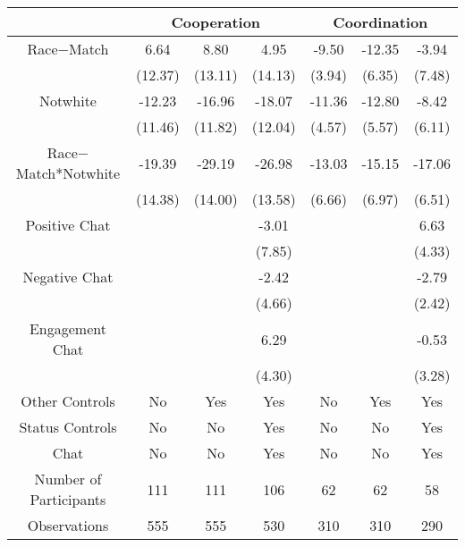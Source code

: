 \begin{table}[htbp]
    \begin{tabular}{c c c c c c c}
    \toprule
          & \multicolumn{3}{c}{Cooperation}   &\multicolumn{3}{c}{Coordination}     \\
\midrule
Race$-$Match      &  6.64                   &   8.80             &  4.95     &  -9.50\sym{**}  &  -12.35\sym{**}   &  -3.94   \\
                  &  (12.37)                &  (13.11)           &  (14.13)   &  (3.94)        &  (6.35)           &  (7.48) \\
\addlinespace
Notwhite        &  -12.23                &   -16.96         &  -18.07  &  -11.36\sym{**}  &   -12.80\sym{**}   &  -8.42     \\
                  &   (11.46)                &    (11.82)         &  (12.04)   &  (4.57)        &    (5.57)     &  (6.11) \\
\addlinespace
Race$-$Match*Notwhite & -19.39   & -29.19\sym{**}  & -26.98\sym{**} & -13.03\sym{*}  & -15.15\sym{**} & -17.06 \sym{**}     \\
                        & (14.38)            &  (14.00)      &  (13.58)   & (6.66)       &    (6.97)        &  (6.51) \\
                        
\addlinespace
Positive  Chat    &                        &           &  -3.01     &             &               &  6.63  \\
                  &                        &           &  (7.85)    &             &                &  (4.33)   \\
\addlinespace
Negative   Chat  &                        &           &  -2.42    &               &                &   -2.79    \\
                 &                        &           &  (4.66)   &               &                 &  (2.42)  \\
\addlinespace
Engagement  Chat   &                      &            &   6.29     &              &                &  -0.53 \\
                   &                     &             &  (4.30)   &               &                &  (3.28) \\

\midrule
Other Controls      &   No   &  Yes     &    Yes    &    No    &    Yes  &    Yes \\
Status Controls     &   No   &    No    &    Yes    &    No    &   No    &    Yes \\
Chat                &    No  &    No    &    Yes     &    No    &    No   &    Yes             \\
\midrule
Number of Participants & 111   &    111 &    106  &   62   &    62 &    58     \\
\midrule
Observations          &   555   &  555  &  530   &  310     &  310   &  290             \\
\bottomrule


\end{tabular}
\end{table}
